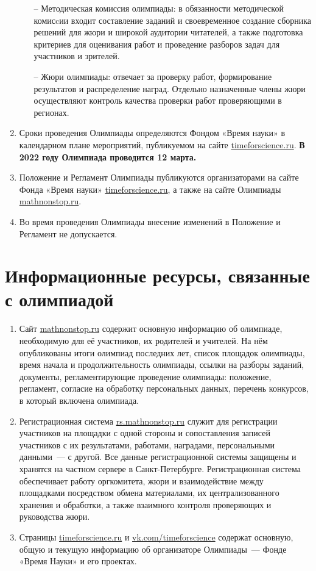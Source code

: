 \documentclass[a4paper,12pt]{article}
\newcommand{\surl}[1]{{\small\url{#1}}}
\begin{document}
\begin{enumerate}
\begin{enumerate}
	   \item[–] Методическая комиссия олимпиады: в обязанности методической комисcии входит составление заданий и своевременное создание сборника решений для жюри и широкой аудитории читателей, а также подготовка критериев для оценивания работ и проведение разборов задач для участников и зрителей.
	   \item[–] Жюри олимпиады: отвечает за проверку работ, формирование результатов и распределение наград. Отдельно назначенные члены жюри осуществляют контроль качества проверки работ проверяющими в регионах.
   \end{enumerate}
	\item Сроки проведения Олимпиады определяются Фондом «Время науки» в календарном плане мероприятий, публикуемом на сайте \surl{timeforscience.ru}. {\bf В 2022 году Олимпиада проводится 12 марта.}
	\item Положение и Регламент Олимпиады публикуются организаторами на сайте Фонда «Время науки» \surl{timeforscience.ru}, а также на сайте Олимпиады \surl{mathnonstop.ru}.
	\item Во время проведения Олимпиады внесение изменений в Положение и Регламент не допускается.
\end{enumerate}

\section{Информационные ресурсы, связанные с олимпиадой}

\begin{enumerate}
	\item Сайт \surl{mathnonstop.ru} содержит основную информацию об олимпиаде, необходимую для её участников, их родителей и учителей. На нём опубликованы итоги олимпиад последних лет, список площадок олимпиады, время начала и продолжительность олимпиады, ссылки на разборы заданий, документы, регламентирующие проведение олимпиады: положение, регламент, согласие на обработку персональных данных, перечень конкурсов, в который включена олимпиада.
	\item Регистрационная система \surl{rs.mathnonstop.ru} служит для регистрации участников на площадки с одной стороны и сопоставления записей участников с их результатами, работами, наградами, персональными данными~— с другой. Все данные регистрационной системы защищены и хранятся на частном сервере в Санкт-Петербурге. Регистрационная система обеспечивает работу оргкомитета, жюри и взаимодействие между площадками посредством обмена материалами, их централизованного хранения и обработки, а также взаимного контроля проверяющих и руководства жюри.
	\item Страницы \surl{timeforscience.ru} и \surl{vk.com/timeforscience} содержат основную, общую и текущую информацию об организаторе Олимпиады~— Фонде «Время Науки» и его проектах.
\end{enumerate}
\end{document}
